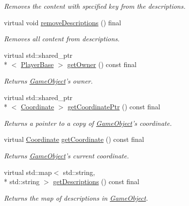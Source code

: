 \begin{DoxyCompactItemize}
\begin{DoxyCompactList}\small\item\em Removes the content with specified key from the descriptions. \end{DoxyCompactList}\item 
virtual void \hyperlink{classCourse_1_1GameObject_adbd24d1cdfbf317bd85ca27732be6a8a}{remove\-Descriptions} () final
\begin{DoxyCompactList}\small\item\em Removes all content from descriptions. \end{DoxyCompactList}\item 
virtual std\-::shared\-\_\-ptr\\*
$<$ \hyperlink{classCourse_1_1PlayerBase}{Player\-Base} $>$ \hyperlink{classCourse_1_1GameObject_a3c923e5d874cada8661d37002073c111}{get\-Owner} () const final
\begin{DoxyCompactList}\small\item\em Returns \hyperlink{classCourse_1_1GameObject}{Game\-Object}'s owner. \end{DoxyCompactList}\item 
virtual std\-::shared\-\_\-ptr\\*
$<$ \hyperlink{classCourse_1_1Coordinate}{Coordinate} $>$ \hyperlink{classCourse_1_1GameObject_a51383b004b38598b7287ed832d43150a}{get\-Coordinate\-Ptr} () const final
\begin{DoxyCompactList}\small\item\em Returns a pointer to a copy of \hyperlink{classCourse_1_1GameObject}{Game\-Object}'s coordinate. \end{DoxyCompactList}\item 
virtual \hyperlink{classCourse_1_1Coordinate}{Coordinate} \hyperlink{classCourse_1_1GameObject_ae3f1f045d5731fa85c9638a1bfa191fe}{get\-Coordinate} () const final
\begin{DoxyCompactList}\small\item\em Returns \hyperlink{classCourse_1_1GameObject}{Game\-Object}'s current coordinate. \end{DoxyCompactList}\item 
virtual std\-::map$<$ std\-::string, \\*
std\-::string $>$ \hyperlink{classCourse_1_1GameObject_aefe5a503378bfc7f6559a8e822491837}{get\-Descriptions} () const final
\begin{DoxyCompactList}\small\item\em Returns the map of descriptions in \hyperlink{classCourse_1_1GameObject}{Game\-Object}. \end{DoxyCompactList}\item 

\end{DoxyCompactItemize}
